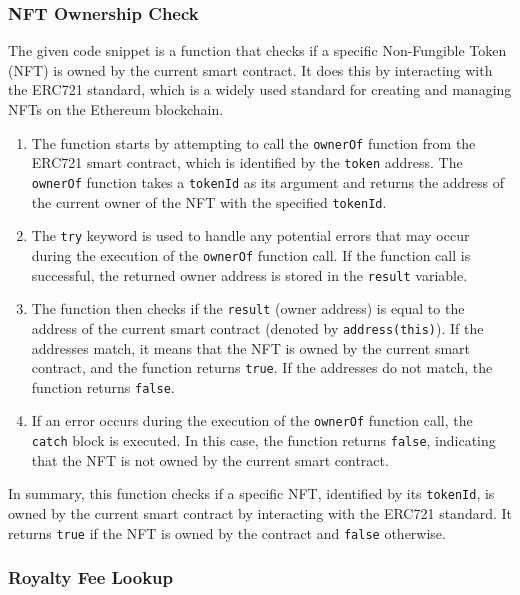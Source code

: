 \hypertarget{nft-ownership-check}{%
\subsubsection{NFT Ownership Check}\label{nft-ownership-check}}

The given code snippet is a function that checks if a specific
Non-Fungible Token (NFT) is owned by the current smart contract. It does
this by interacting with the ERC721 standard, which is a widely used
standard for creating and managing NFTs on the Ethereum blockchain.

\begin{enumerate}
\def\labelenumi{\arabic{enumi}.}
\item
  The function starts by attempting to call the \texttt{ownerOf}
  function from the ERC721 smart contract, which is identified by the
  \texttt{token} address. The \texttt{ownerOf} function takes a
  \texttt{tokenId} as its argument and returns the address of the
  current owner of the NFT with the specified \texttt{tokenId}.
\item
  The \texttt{try} keyword is used to handle any potential errors that
  may occur during the execution of the \texttt{ownerOf} function call.
  If the function call is successful, the returned owner address is
  stored in the \texttt{result} variable.
\item
  The function then checks if the \texttt{result} (owner address) is
  equal to the address of the current smart contract (denoted by
  \texttt{address(this)}). If the addresses match, it means that the NFT
  is owned by the current smart contract, and the function returns
  \texttt{true}. If the addresses do not match, the function returns
  \texttt{false}.
\item
  If an error occurs during the execution of the \texttt{ownerOf}
  function call, the \texttt{catch} block is executed. In this case, the
  function returns \texttt{false}, indicating that the NFT is not owned
  by the current smart contract.
\end{enumerate}

In summary, this function checks if a specific NFT, identified by its
\texttt{tokenId}, is owned by the current smart contract by interacting
with the ERC721 standard. It returns \texttt{true} if the NFT is owned
by the contract and \texttt{false} otherwise.

\hypertarget{royalty-fee-lookup}{%
\subsubsection{Royalty Fee Lookup}\label{royalty-fee-lookup}}

